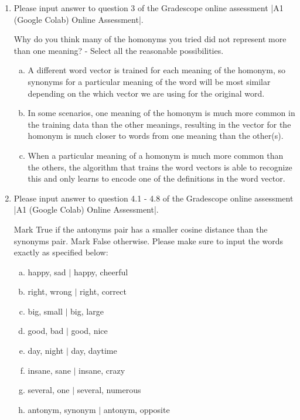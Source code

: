 \begin{enumerate}[1.]

\item {}

Please input answer to question 3 of the Gradescope online assessment |A1 (Google Colab) Online Assessment|.

Why do you think many of the homonyms you tried did not represent more than one meaning? - Select all the reasonable possibilities.

\begin{enumerate}[a.]
\item A different word vector is trained for each meaning of the homonym, so synonyms for a particular meaning of the word will be most similar depending on the which vector we are using for the original word.

\item In some scenarios, one meaning of the homonym is much more common in the training data than the other meanings, resulting in the vector for the homonym is much closer to words from one meaning than the other(s).

\item When a particular meaning of a homonym is much more common than the others, the algorithm that trains the word vectors is able to recognize this and only learns to encode one of the definitions in the word vector.
\end{enumerate}


\item {}

Please input answer to question 4.1 - 4.8 of the Gradescope online assessment |A1 (Google Colab) Online Assessment|.

Mark True if the antonyms pair has a smaller cosine distance than the synonyms pair. Mark False otherwise. Please make sure to input the words exactly as specified below: 
\begin{enumerate}[a.]
\item \textsf{happy, sad $\vert$ happy, cheerful}
\item \textsf{right, wrong $\vert$ right, correct}
\item \textsf{big, small $\vert$ big, large}
\item \textsf{good, bad $\vert$ good, nice}
\item \textsf{day, night $\vert$ day, daytime}
\item \textsf{insane, sane $\vert$ insane, crazy}
\item \textsf{several, one $\vert$ several, numerous}
\item \textsf{antonym, synonym $\vert$ antonym, opposite}
\end{enumerate}


\end{enumerate}
